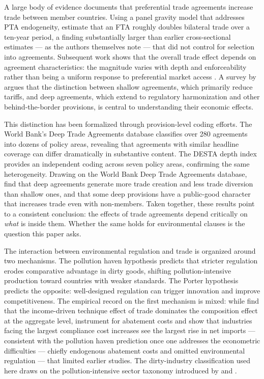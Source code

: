 \documentclass[12pt]{article}
\begin{document}
A large body of evidence documents that preferential trade agreements increase trade between member countries. Using a panel gravity model that addresses PTA endogeneity, \citet{baier2007} estimate that an FTA roughly doubles bilateral trade over a ten-year period, a finding substantially larger than earlier cross-sectional estimates --- as the authors themselves note --- that did not control for selection into agreements. Subsequent work shows that the overall trade effect depends on agreement characteristics: the magnitude varies with depth and enforceability rather than being a uniform response to preferential market access \citep{baier2009}. A survey by \citet{freund2010} argues that the distinction between shallow agreements, which primarily reduce tariffs, and deep agreements, which extend to regulatory harmonization and other behind-the-border provisions, is central to understanding their economic effects.

This distinction has been formalized through provision-level coding efforts. The World Bank's Deep Trade Agreements database \citep{hofmann2017} classifies over 280 agreements into dozens of policy areas, revealing that agreements with similar headline coverage can differ dramatically in substantive content. The DESTA depth index \citep{dur2014} provides an independent coding across seven policy areas, confirming the same heterogeneity. Drawing on the World Bank Deep Trade Agreements database, \citet{mattoo2022} find that deep agreements generate more trade creation and less trade diversion than shallow ones, and that some deep provisions have a public-good character that increases trade even with non-members. Taken together, these results point to a consistent conclusion: the effects of trade agreements depend critically on \emph{what} is inside them. Whether the same holds for environmental clauses is the question this paper asks.

The interaction between environmental regulation and trade is organized around two mechanisms. The pollution haven hypothesis \citep{copelandtaylor1994} predicts that stricter regulation erodes comparative advantage in dirty goods, shifting pollution-intensive production toward countries with weaker standards. The Porter hypothesis \citep{porter1995} predicts the opposite: well-designed regulation can trigger innovation and improve competitiveness. The empirical record on the first mechanism is mixed: while \citet{antweiler2001} find that the income-driven technique effect of trade dominates the composition effect at the aggregate level, \citet{levinsontaylor2008} instrument for abatement costs and show that industries facing the largest compliance cost increases see the largest rise in net imports --- consistent with the pollution haven prediction once one addresses the econometric difficulties --- chiefly endogenous abatement costs and omitted environmental regulation --- that limited earlier studies. The dirty-industry classification used here draws on the pollution-intensive sector taxonomy introduced by \citet{mani1998} and \citet{low1992}.
\end{document}
